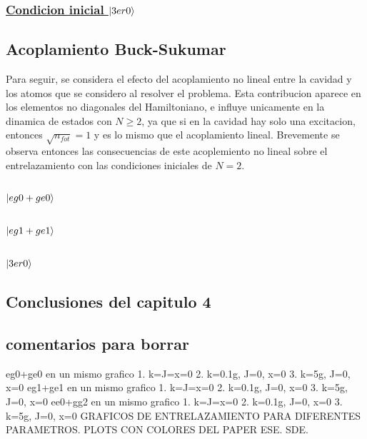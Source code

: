 \subsubsection{\underline{Condicion inicial $\ket{3er0}$}}


\subsection{Acoplamiento Buck-Sukumar}
Para seguir, se considera el efecto del acoplamiento no lineal entre la cavidad y los atomos que se considero al resolver el problema. Esta contribucion aparece en los elementos no diagonales del Hamiltoniano, e influye unicamente en la dinamica de estados con $N\geq2$, ya que si en la cavidad hay solo una excitacion, entonces $\sqrt{n_{fot}}=1$ y es lo mismo que el acoplamiento lineal. Brevemente se observa entonces las consecuencias de este acoplemiento no lineal sobre el entrelazamiento con las condiciones iniciales de $N=2$.
\subsubsection{$\ket{eg0+ge0}$}
\subsubsection{$\ket{eg1+ge1}$}
\subsubsection{$\ket{3er0}$}

\subsection{Conclusiones del capitulo 4}

\subsection{comentarios para borrar}

eg0+ge0 en un mismo grafico
1. k=J=x=0 
2. k=0.1g, J=0, x=0
3. k=5g, J=0, x=0
eg1+ge1 en un mismo grafico
1. k=J=x=0 
2. k=0.1g, J=0, x=0
3. k=5g, J=0, x=0
ee0+gg2 en un mismo grafico
1. k=J=x=0 
2. k=0.1g, J=0, x=0
3. k=5g, J=0, x=0
GRAFICOS DE ENTRELAZAMIENTO PARA DIFERENTES PARAMETROS. PLOTS CON COLORES DEL PAPER ESE. SDE. 
